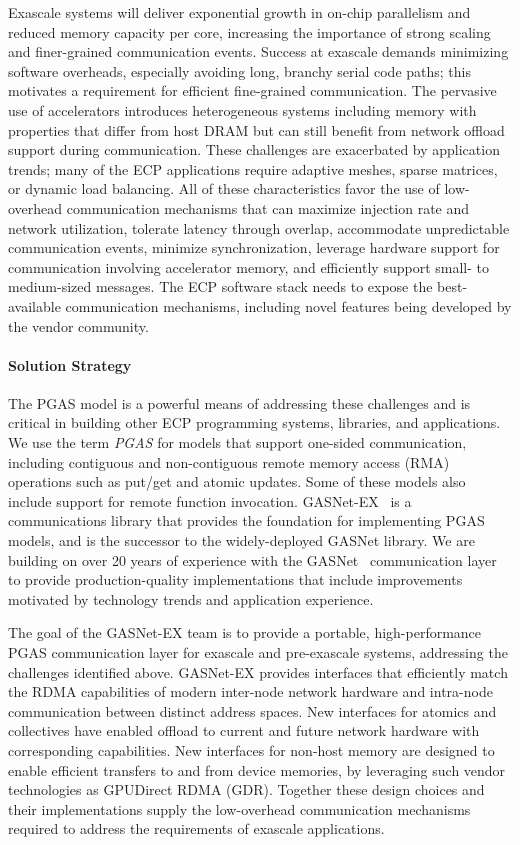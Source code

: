 Exascale systems will deliver exponential growth in on-chip parallelism and
reduced memory capacity per core, 
increasing the importance of strong
scaling and finer-grained communication events.  
Success at exascale demands minimizing software overheads,
especially avoiding long, branchy serial code paths; 
this motivates a requirement for efficient
fine-grained communication.
The pervasive use of accelerators introduces heterogeneous systems including
memory with properties that differ from host DRAM but can still benefit from
network offload support during communication.
These challenges are exacerbated by application trends; many of the ECP applications require
adaptive meshes, sparse matrices,
or dynamic load balancing.
All of these characteristics favor the use of
low-overhead communication mechanisms that
can maximize injection rate and network utilization, tolerate latency through
overlap, accommodate unpredictable communication events, minimize synchronization,
leverage hardware support for communication involving accelerator memory,
and efficiently support small- to medium-sized messages. The ECP software stack
needs to expose the best-available communication mechanisms, including novel
features being developed by the vendor community.

\paragraph{Solution Strategy}

The PGAS model is a powerful means of addressing these
challenges and is critical in building other ECP programming systems,
libraries, and applications.  We use the term {\em PGAS} for models that support
one-sided communication, 
including contiguous and non-contiguous remote memory access (RMA) operations such as put/get
and atomic updates. Some of these models also include support for remote function invocation.
GASNet-EX~\cite{gasnet-lcpc18} is a communications library that provides the foundation for implementing
PGAS models, and is the successor to the widely-deployed GASNet library.
We are building on over 20 years of experience with the GASNet~\cite{gasnet-site,gasnet-spec}
communication layer to provide production-quality implementations that include
improvements motivated by
technology trends and application experience.  

The goal of the GASNet-EX team is to provide a portable, high-performance PGAS
communication layer for exascale and pre-exascale systems, addressing the challenges
identified above.
GASNet-EX provides interfaces that efficiently match the RDMA capabilities of modern
inter-node network hardware and intra-node communication between distinct address spaces.
New interfaces for atomics and collectives have enabled offload to current
and future network hardware with corresponding capabilities.
New interfaces for non-host memory are designed to enable efficient transfers
to and from device memories, by leveraging such vendor technologies as
GPUDirect RDMA (GDR).
Together these design choices and their implementations supply the low-overhead communication
mechanisms required to address the requirements of exascale applications.

